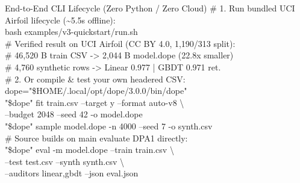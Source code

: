 \documentclass[8.5pt,letterpaper]{article}
\begin{document}
\begin{minipage}[t]{0.486\textwidth}
  \vspace{0pt}
  \begin{codecard}{End-to-End CLI Lifecycle (Zero Python / Zero Cloud)}
{\color{codecomment}\# 1. Run bundled UCI Airfoil lifecycle (\textasciitilde 5.5s offline):}\\
bash examples/v3-quickstart/run.sh\\[2.5pt]
{\color{codecomment}\# Verified result on UCI Airfoil (CC BY 4.0, 1,190/313 split):}\\
{\color{codecomment}\#   46,520 B train CSV -> 2,044 B model.dope (22.8x smaller)}\\
{\color{codecomment}\#   4,760 synthetic rows -> Linear 0.977 | GBDT 0.971 ret.}\\[3.5pt]
{\color{codecomment}\# 2. Or compile \& test your own headered CSV:}\\
dope="\$HOME/.local/opt/dope/3.0.0/bin/dope"\\
"\$dope" fit train.csv --target y --format auto-v8 \textbackslash\\
\hspace*{1.2em}--budget 2048 --seed 42 -o model.dope\\
"\$dope" sample model.dope -n 4000 --seed 7 -o synth.csv\\
{\color{codecomment}\# Source builds on main evaluate DPA1 directly:}\\
"\$dope" eval -m model.dope --train train.csv \textbackslash\\
\hspace*{1.2em}--test test.csv --synth synth.csv \textbackslash\\
\hspace*{1.2em}--auditors linear,gbdt --json eval.json
  \end{codecard}


\end{minipage}
\end{document}
